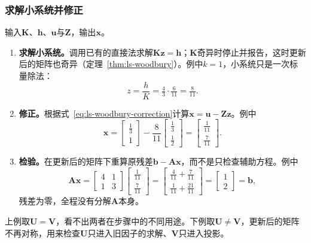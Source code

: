\subsubsection{求解小系统并修正}
输入$\bm K$、$\bm h$、$\bm u$与$\bm Z$，输出$\bm x$。
\begin{enumerate}
 \item \textbf{求解小系统。}调用已有的直接法求解$\bm K\bm z=\bm h$；$\bm K$奇异时停止并报告，这时更新后的矩阵也奇异（定理~\ref{thm:ls-woodbury}）。例中$k=1$，小系统只是一次标量除法：
 \[
  z=\frac{h}{K}=\tfrac43\cdot\tfrac6{11}=\tfrac8{11}.
 \]

 \item \textbf{修正。}根据式~\eqref{eq:ls-woodbury-correction}计算$\bm x=\bm u-\bm Z\bm z$。例中
 \[
  \bm x=\begin{bmatrix}\tfrac13\\1\end{bmatrix}-\frac8{11}\begin{bmatrix}\tfrac13\\\tfrac12\end{bmatrix}
  =\begin{bmatrix}\tfrac1{11}\\\tfrac7{11}\end{bmatrix}.
 \]

 \item \textbf{检验。}在更新后的矩阵下重算原残差$\bm b-\bm A\bm x$，而不是只检查辅助方程。例中
 \[
  \bm A\bm x=\begin{bmatrix}4&1\\1&3\end{bmatrix}\begin{bmatrix}\tfrac1{11}\\\tfrac7{11}\end{bmatrix}
  =\begin{bmatrix}\tfrac4{11}+\tfrac7{11}\\\tfrac1{11}+\tfrac{21}{11}\end{bmatrix}
  =\begin{bmatrix}1\\2\end{bmatrix}=\bm b,
 \]
 残差为零，全程没有分解$\bm A$本身。
\end{enumerate}

上例取$\bm U=\bm V$，看不出两者在步骤中的不同用途。下例取$\bm U\neq\bm V$，更新后的矩阵不再对称，用来检查$\bm U$只进入旧因子的求解、$\bm V$只进入投影。

